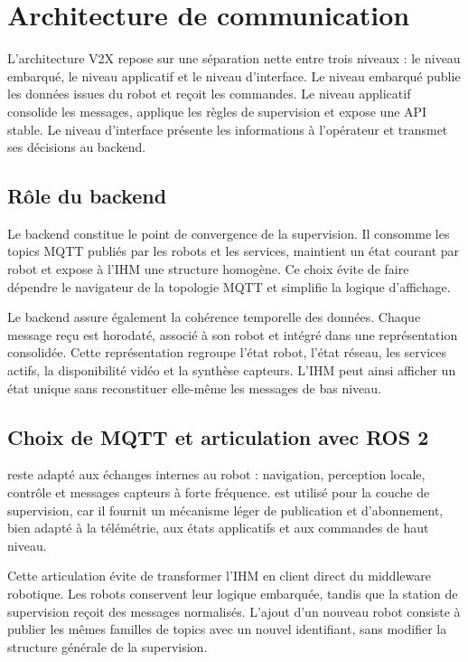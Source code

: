\section{Architecture de communication}

L'architecture V2X repose sur une séparation nette entre trois niveaux : le niveau embarqué, le niveau applicatif et le niveau d'interface. Le niveau embarqué publie les données issues du robot et reçoit les commandes. Le niveau applicatif consolide les messages, applique les règles de supervision et expose une API stable. Le niveau d'interface présente les informations à l'opérateur et transmet ses décisions au backend.

\subsection{Rôle du backend}

Le backend constitue le point de convergence de la supervision. Il consomme les topics MQTT publiés par les robots et les services, maintient un état courant par robot et expose à l'IHM une structure homogène. Ce choix évite de faire dépendre le navigateur de la topologie MQTT et simplifie la logique d'affichage.

Le backend assure également la cohérence temporelle des données. Chaque message reçu est horodaté, associé à son robot et intégré dans une représentation consolidée. Cette représentation regroupe l'état robot, l'état réseau, les services actifs, la disponibilité vidéo et la synthèse capteurs. L'IHM peut ainsi afficher un état unique sans reconstituer elle-même les messages de bas niveau.

\subsection{Choix de MQTT et articulation avec ROS 2}

 reste adapté aux échanges internes au robot : navigation, perception locale, contrôle et messages capteurs à forte fréquence.  est utilisé pour la couche de supervision, car il fournit un mécanisme léger de publication et d'abonnement, bien adapté à la télémétrie, aux états applicatifs et aux commandes de haut niveau.

Cette articulation évite de transformer l'IHM en client direct du middleware robotique. Les robots conservent leur logique embarquée, tandis que la station de supervision reçoit des messages normalisés. L'ajout d'un nouveau robot consiste à publier les mêmes familles de topics avec un nouvel identifiant, sans modifier la structure générale de la supervision.

